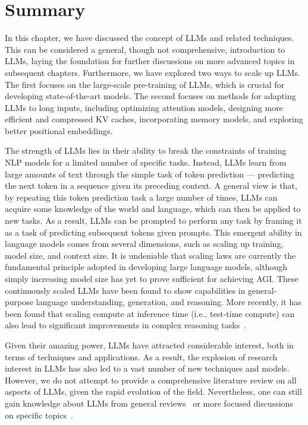 
\section{Summary}

In this chapter, we have discussed the concept of LLMs and related techniques. This can be considered a general, though not comprehensive, introduction to LLMs, laying the foundation for further discussions on more advanced topics in subsequent chapters. Furthermore, we have explored two ways to scale up LLMs. The first focuses on the large-scale pre-training of LLMs, which is crucial for developing state-of-the-art models. The second focuses on methods for adapting LLMs to long inputs, including optimizing attention models, designing more efficient and compressed KV caches, incorporating memory models, and exploring better positional embeddings.

The strength of LLMs lies in their ability to break the constraints of training NLP models for a limited number of specific tasks. Instead, LLMs learn from large amounts of text through the simple task of token prediction --- predicting the next token in a sequence given its preceding context. A general view is that, by repeating this token prediction task a large number of times, LLMs can acquire some knowledge of the world and language, which can then be applied to new tasks. As a result, LLMs can be prompted to perform any task by framing it as a task of predicting subsequent tokens given prompts. This emergent ability in language models comes from several dimensions, such as scaling up training, model size, and context size. It is undeniable that scaling laws are currently the fundamental principle adopted in developing large language models, although simply increasing model size has yet to prove sufficient for achieving AGI. These continuously scaled LLMs have been found to show capabilities in general-purpose language understanding, generation, and reasoning. More recently, it has been found that scaling compute at inference time (i.e., test-time compute) can also lead to significant improvements in complex reasoning tasks~\cite{openai:2024learning}.

Given their amazing power, LLMs have attracted considerable interest, both in terms of techniques and applications. As a result, the explosion of research interest in LLMs has also led to a vast number of new techniques and models. However, we do not attempt to provide a comprehensive literature review on all aspects of LLMs, given the rapid evolution of the field. Nevertheless, one can still gain knowledge about LLMs from general reviews~\cite{zhao-etal:2023survey,minaee-etal:2024large} or more focused discussions on specific topics~\cite{ruan-etal:2024abigsurveyofllms}.

